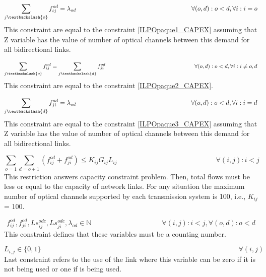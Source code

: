 \begin{equation}
\sum_{j\textbackslash \{o\}} f_{ij}^{od} = \lambda_{od}  \qquad \qquad \qquad \qquad \qquad \qquad \qquad \qquad \qquad
\forall(o,d) : o < d, \forall i: i = o
\label{ILPTransluc6}
\end{equation}
\noindent
This constraint are equal to the constraint \ref{ILPOpaque1_CAPEX} assuming that Z variable has the value of number of optical channels between this demand for all bidirectional links.

\begin{equation}
\sum_{j\textbackslash \{o\}} f_{ij}^{od} = \sum_{j\textbackslash \{d\}} f_{ji}^{od} \qquad \qquad \qquad \qquad \qquad \qquad \qquad \qquad
\forall(o,d) : o < d, \forall i: i \neq o,d
\label{ILPTransluc7}
\end{equation}
\noindent
This constraint are equal to the constraint \ref{ILPOpaque2_CAPEX}.

\begin{equation}
\sum_{j\textbackslash \{d\}} f_{ji}^{od} = \lambda_{od}  \qquad \qquad \qquad \qquad \qquad \qquad \qquad \qquad \qquad
\forall(o,d) : o < d, \forall i: i = d
\label{ILPTransluc8}
\end{equation}
\noindent
This constraint are equal to the constraint \ref{ILPOpaque3_CAPEX} assuming that Z variable has the value of number of optical channels between this demand for all bidirectional links.

\begin{equation}
\sum_{o=1} \sum_{d=o+1} \left( f_{ij}^{od} + f_{ji}^{od}\right) \leq K_{ij} G_{ij} L_{ij} \qquad \qquad \qquad \qquad \qquad \qquad \qquad
\forall (i,j) : i < j
\label{ILPTransluc9}
\end{equation}
\noindent
This restriction answers capacity constraint problem. Then, total flows must be less or equal to the capacity of network links. For any situation the maximum number of optical channels supported by each transmission system is 100, i.e., $K_{ij}$ = 100.

\begin{equation}
f_{ij}^{od} , f_{ji}^{od} , Ls_{ij}^{odc} , Ls_{ji}^{odc} , \lambda_{od} \in \mathbb{N}   \qquad \qquad \qquad \qquad \qquad
\forall(i,j) : i < j, \forall(o,d) : o < d
\label{ILPTransluc10}
\end{equation}
\noindent
This constraint defines that these variables must be a counting number.

\begin{equation}
L_{i,j} \in \{0,1\} \qquad \qquad \qquad \qquad \qquad \qquad \qquad \qquad \qquad \qquad \qquad \qquad \qquad \qquad
\forall(i,j)
\label{ILPTransluc11}
\end{equation}
\noindent
Last constraint refers to the use of the link where this variable can be zero if it is not being used or one if is being used.

